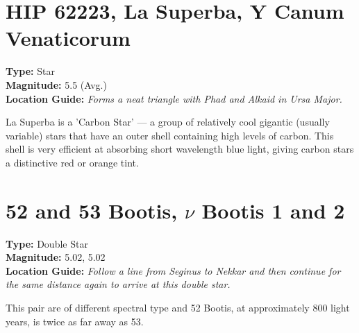 \section{HIP 62223, La Superba, Y Canum Venaticorum}
\textbf{Type:} Star \\
\textbf{Magnitude:} 5.5 (Avg.) \\
\textbf{Location Guide:} \textit{Forms a neat triangle with Phad and Alkaid in Ursa Major.} 

La Superba is a 'Carbon Star' --- a group of relatively cool gigantic (usually variable) stars that have an outer shell containing high levels of carbon. This shell is very efficient at absorbing short wavelength blue light, giving carbon stars a distinctive red or orange tint. 

\section{52 and 53 Bootis, $\nu$ Bootis 1 and 2} 
\textbf{Type:} Double Star \\
\textbf{Magnitude:} 5.02, 5.02 \\
\textbf{Location Guide:} \textit{Follow a line from Seginus to Nekkar and then continue for the same distance again to arrive at this double star.} 

This pair are of different spectral type and 52 Bootis, at approximately 800 light years, is twice as far away as 53.


